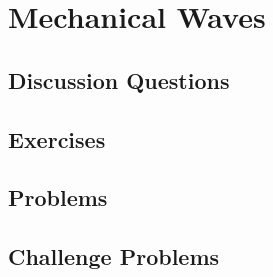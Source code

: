 
\chapter{Mechanical Waves}

\section{Discussion Questions}

\section{Exercises}

\section{Problems}

\section{Challenge Problems}
